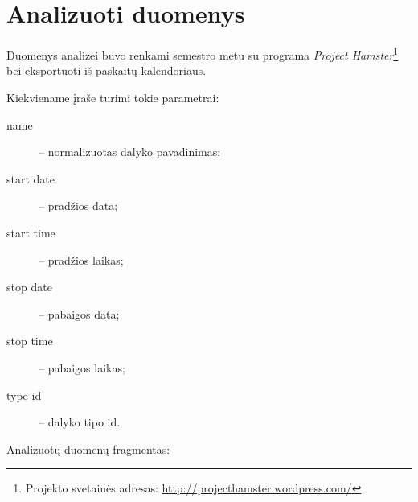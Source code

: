 \chapter{Analizuoti duomenys}

Duomenys analizei buvo renkami semestro metu su programa \emph{Project 
Hamster}\footnote{
Projekto svetainės adresas: \url{http://projecthamster.wordpress.com/}}
bei eksportuoti iš paskaitų kalendoriaus.

Kiekviename įraše turimi tokie parametrai:
\begin{description}
  \item[name] – normalizuotas dalyko pavadinimas;
  \item[start date] – pradžios data;
  \item[start time] – pradžios laikas;
  \item[stop date] – pabaigos data;
  \item[stop time] – pabaigos laikas;
  \item[type id] – dalyko tipo id.
\end{description}

Analizuotų duomenų fragmentas:

